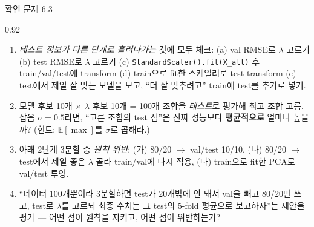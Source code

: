 \begin{frame}{확인 문제 6.3}
\begin{center}\begin{varwidth}{0.92\textwidth}
  \small
  \begin{enumerate}
    \item \emph{테스트 정보가 다른 단계로 흘러나가는} 것에 모두 체크:
      (a) val RMSE로 $\lambda$ 고르기 (b) test RMSE로 $\lambda$ 고르기
      (c) \texttt{StandardScaler().fit(X\_all)} 후 train/val/test에
      transform (d) train으로 fit한 스케일러로 test transform
      (e) test에서 제일 잘 맞는 모델을 보고, ``더 잘 맞추려고'' train에
      test를 추가로 넣기.
    \item 모델 후보 10개 $\times$ $\lambda$ 후보 10개 = 100개 조합을
      \emph{테스트}로 평가해 최고 조합 고름. 잡음 $\sigma=0.5$라면,
      ``고른 조합의 test 점''은 진짜 성능보다 \textbf{평균적으로} 얼마나
      높을까? (힌트: $\mathbb{E}[\max]$를 $\sigma$로 곱해라.)
    \item 아래 2단계 3분할 중 \emph{원칙 위반}: (가) 80/20 $\to$
      val/test 10/10, (나) 80/20 $\to$ test에서 제일 좋은 $\lambda$ 골라
      train/val에 다시 적용, (다) train으로 fit한 PCA로 val/test 투영.
    \item ``데이터 100개뿐이라 3분할하면 test가 20개밖에 안 돼서 val을 빼고
      80/20만 쓰고, test로 $\lambda$를 고르되 최종 수치는 그 test의 5-fold
      평균으로 보고하자''는 제안을 평가 — 어떤 점이 원칙을 지키고, 어떤
      점이 위반하는가?
  \end{enumerate}
\end{varwidth}\end{center}
\end{frame}
